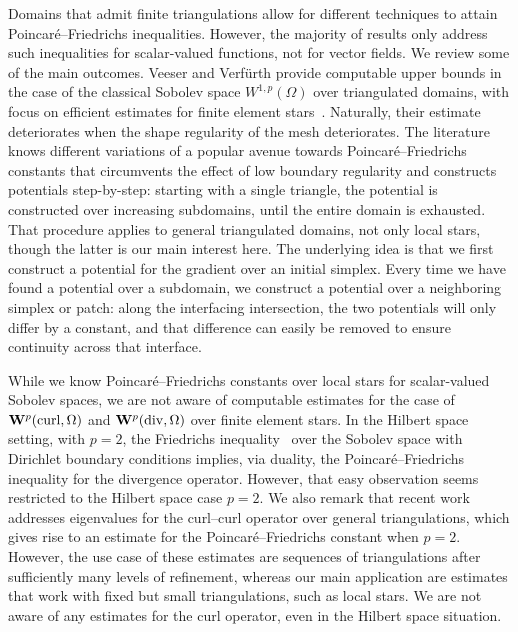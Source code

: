 \documentclass[12pt,a4paper]{article}
\begin{document}
Domains that admit finite triangulations allow for different techniques to attain Poincar\'e--Friedrichs inequalities. 
However, the majority of results only address such inequalities for scalar-valued functions, not for vector fields. 
We review some of the main outcomes. 
Veeser and Verf\"urth provide computable upper bounds in the case of the classical Sobolev space $W^{1,p}(\Omega)$ over triangulated domains, with focus on efficient estimates for finite element stars~\cite{veeser2012poincare}. Naturally, their estimate deteriorates when the shape regularity of the mesh deteriorates. 
% 
The literature~\cite{Eym_Gal_Her_00,vohralik2005discrete,ern2020stable,ern2021finite,Chaum_Voh_p_rob_3D_H_curl_23,Voh_loc_glob_H1_24} knows different variations of a popular avenue towards Poincar\'e--Friedrichs constants that circumvents the effect of low boundary regularity and constructs potentials step-by-step: 
starting with a single triangle, the potential is constructed over increasing subdomains, until the entire domain is exhausted. That procedure applies to general triangulated domains, not only local stars, though the latter is our main interest here. 
The underlying idea is that we first construct a potential for the gradient over an initial simplex. 
Every time we have found a potential over a subdomain, we construct a potential over a neighboring simplex or patch:
along the interfacing intersection, the two potentials will only differ by a constant, 
and that difference can easily be removed to ensure continuity across that interface. 

While we know Poincar\'e--Friedrichs constants over local stars for scalar-valued Sobolev spaces, 
we are not aware of computable estimates for the case of ${\mathbf W}^{p}(\operatorname{curl},\Omega)$ and ${\mathbf W}^{p}(\operatorname{div},\Omega)$ over finite element stars. 
In the Hilbert space setting, with $p=2$, the Friedrichs inequality~\cite{burenkov1998sobolev} over the Sobolev space with Dirichlet boundary conditions implies, 
via duality, the Poincar\'e--Friedrichs inequality for the divergence operator. However, that easy observation seems restricted to the Hilbert space case $p=2$. 
We also remark that recent work~\cite{gallistl2023computational} addresses eigenvalues for the curl--curl operator over general triangulations,
which gives rise to an estimate for the Poincar\'e--Friedrichs constant when $p=2$. However, the use case of these estimates are sequences of triangulations after sufficiently many levels of refinement, whereas our main application are estimates that work with fixed but small triangulations, such as local stars. 
We are not aware of any estimates for the curl operator, even in the Hilbert space situation. 
\end{document}
